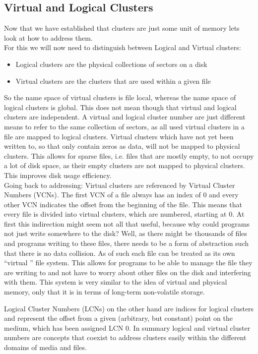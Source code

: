\subsection{Virtual and Logical Clusters}
\label{sec:Cluster:CN}
Now that we have established that clusters are just some unit of memory lets look at how to address them. \\
For this we will now need to distinguish between Logical and Virtual clusters:
\begin{itemize}
	\item Logical clusters are the physical collections of sectors on a disk 
	\item Virtual clusters are the clusters that are used within a given file
\end{itemize}
So the name space of virtual clusters is file local, whereas the name space of logical clusters is global. This does not mean though that virtual and logical clusters are independent. A virtual and logical cluster number are just different means to refer to the same collection of sectors, as all used virtual clusters in a file are mapped to logical clusters. Virtual clusters which have not yet been written to, so that  only contain zeros as data, will not be mapped to physical clusters.
This allows for sparse files, i.e. files that are mostly empty, to not occupy a lot of disk space, as their empty clusters are not mapped to physical clusters. This improves disk usage efficiency.\cite{RUSSINOVICH_ET_AL:2012:WI}\\
Going back to addressing: Virtual clusters are referenced by Virtual Cluster Numbers (VCNs). The first VCN of a file always has an index of $0$ and every other VCN indicates the offset from the beginning of the file. This means that every file is divided into virtual clusters, which are numbered, starting at 0. At first this indirection might seem not all that useful, because why could programs not  just write somewhere to the disk? Well, as there might be thousands of files and programs writing to these files, there needs to be a form of abstraction such that there is no data collision. As of such each file can be treated as its own ``virtual '' file system. This allows for programs to be able to manage the file they are writing to and not have to worry about other files on the disk and interfering with them. This system is very similar to the idea of virtual and physical memory, only that it  is in terms of long-term non-volatile storage.

Logical Cluster Numbers (LCNs) on the other hand are indices for logical clusters and represent the offset from a given (arbitrary, but constant) point on the medium, which has been assigned LCN $0$.\cite{RUSSINOVICH_ET_AL:2012:WI}
In summary logical and virtual cluster numbers are concepts that coexist to address clusters easily within the different domains of media and files.